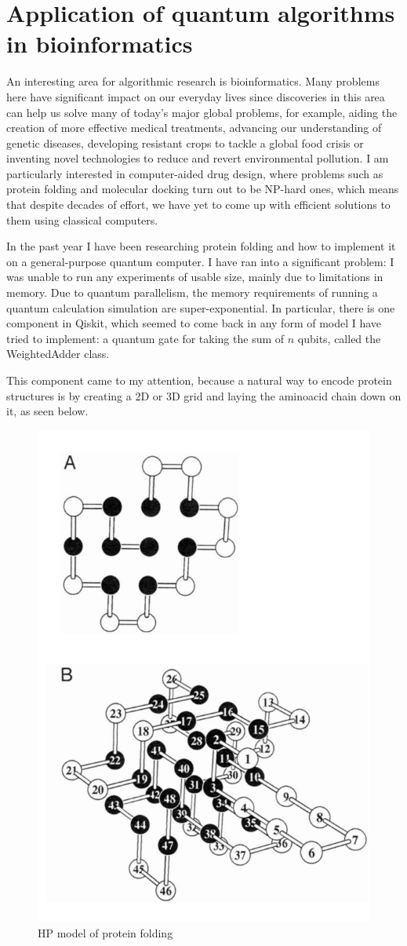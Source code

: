 \section{Application of quantum algorithms in bioinformatics}

An interesting area for algorithmic research is bioinformatics. Many problems here have significant impact on our everyday lives since discoveries in this area can help us solve many of today’s major global problems, for example, aiding the creation of more effective medical treatments, advancing our understanding of genetic diseases, developing resistant crops to tackle a global food crisis or inventing novel technologies to reduce and revert environmental pollution. I am particularly interested in computer-aided drug design, where problems such as protein folding\cite{crescenzi_complexity_1998} and molecular docking\cite{a_molecular_2018} turn out to be NP-hard ones, which means that despite decades of effort, we have yet to come up with efficient solutions to them using classical computers.

In the past year I have been researching protein folding and how to implement it on a general-purpose quantum computer. I have ran into a significant problem: I was unable to run any experiments of usable size, mainly due to limitations in memory. Due to quantum parallelism, the memory requirements of running a quantum calculation simulation are super-exponential. In particular, there is one component in Qiskit, which seemed to come back in any form of model I have tried to implement: a quantum gate for taking the sum of $n$ qubits, called the WeightedAdder class. 

This component came to my attention, because a natural way to encode protein structures is by creating a 2D or 3D grid and laying the aminoacid chain down on it\cite{dill_principles_2008}, as seen below.

\begin{figure}[H]
    \centering
    \includegraphics[width=0.5\linewidth]{figures/bioinformatics/hp_model.png}
    \caption{HP model of protein folding\cite{dill_principles_2008}}
\end{figure}

